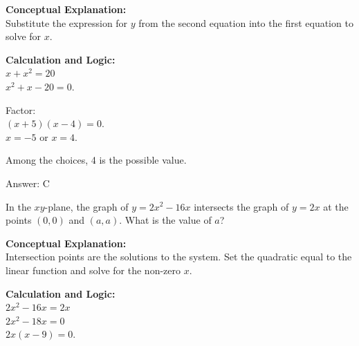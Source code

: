\documentclass[11pt,paper=a4,answers]{exam}
\begin{document}
\begin{questions}
\begin{solution}
\textbf{Conceptual Explanation:} \\
Substitute the expression for $y$ from the second equation into the first equation to solve for $x$.

\vspace{20pt}

\textbf{Calculation and Logic:} \\
$x + x^2 = 20$ \\
$x^2 + x - 20 = 0$.

\vspace{10pt}

Factor: \\
$(x + 5)(x - 4) = 0$. \\
$x = -5$ or $x = 4$.

\vspace{10pt}

Among the choices, 4 is the possible value.

\vspace{25pt}

Answer: \colorbox{yellow!100}{C}
\end{solution}

\vspace{40pt}

\question
In the $xy$-plane, the graph of $y = 2x^2 - 16x$ intersects the graph of $y = 2x$ at the points $(0, 0)$ and $(a, a)$. What is the value of $a$?

\begin{solution}
\textbf{Conceptual Explanation:} \\
Intersection points are the solutions to the system. Set the quadratic equal to the linear function and solve for the non-zero $x$.

\vspace{20pt}

\textbf{Calculation and Logic:} \\
$2x^2 - 16x = 2x$ \\
$2x^2 - 18x = 0$ \\
$2x(x - 9) = 0$.

\vspace{10pt}


\end{solution}
\end{questions}
\end{document}
